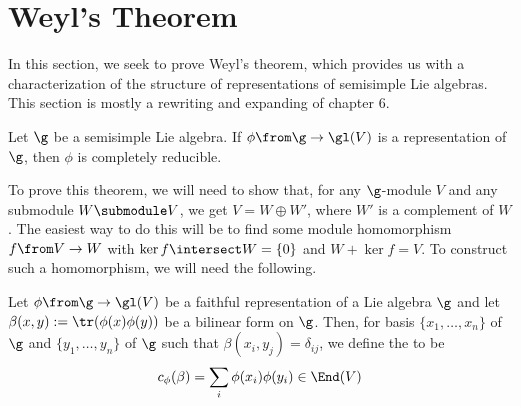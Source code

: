 \documentclass[11pt,leqno,oneside]{amsart}
\numberwithin{thm}{section}
\begin{document}
\section{Weyl's Theorem}
In this section, we seek to prove Weyl's theorem, which provides us
with a characterization of the structure of representations of
semisimple Lie algebras. This section is mostly a rewriting and
expanding of \cite{humph} chapter 6.
\begin{thm}\label{weyls-thm}
  Let \(\g\) be a semisimple Lie algebra. If \(\phi \from \g \to
  \gl(V)\) is a representation of \(\g\), then \(\phi\) is completely
  reducible.
\end{thm}
To prove this theorem, we will need to show that, for any
\(\g\)-module \(V\) and any submodule \(W \submodule V\), we get \(V =
W \oplus W'\), where \(W'\) is a complement of \(W\). The easiest way
to do this will be to find some module homomorphism \(f \from V \to
W\) with \(\ker f \intersect W = \{0\}\) and \(W + \ker f = V\). To
construct such a homomorphism, we will need the following.
\begin{defn}
  Let \(\phi \from \g \to \gl(V)\) be a faithful representation of a
  Lie algebra \(\g\) and let \(\beta(x,y) := \tr(\phi(x) \phi(y))\) be
  a bilinear form on \(\g\). Then, for basis \(\{x_1, \ldots, x_n\}\)
  of \(\g\) and \(\{y_1, \ldots, y_n\}\) of \(\g\) such that
  \(\beta(x_i,y_j) = \delta_{ij}\), we define the  to be \[
    c_\phi(\beta) = \sum_i \phi(x_i) \phi(y_i) \in \End(V)
  \]
\end{defn}
\end{document}
